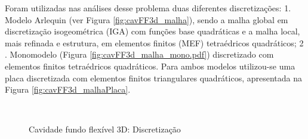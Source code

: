 Foram utilizadas nas análises desse problema duas diferentes discretizações: 1. Modelo Arlequin (ver Figura \ref{fig:cavFF3d_malha}), sendo a malha global em discretização isogeométrica (IGA) com funções base quadráticas e a malha local, mais refinada e estrutura, em elementos finitos (MEF) tetraédricos quadráticos; 2 . Monomodelo (Figura \ref{fig:cavFF3d_malha_mono.pdf}) discretizado com elementos finitos tetraédricos quadráticos. Para ambos modelos utilizou-se uma placa discretizada com elementos finitos triangulares quadráticos, apresentada na Figura \ref{fig:cavFF3d_malhaPlaca}.

\begin{figure}[!htbp]
	\caption{Cavidade fundo flexível 3D: Discretização}
	\centering
	 \ 
	 \\

\end{figure}
